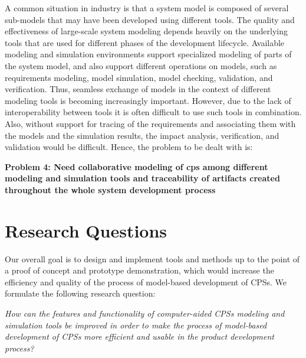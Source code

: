 A common situation in industry is that a system model is composed of several sub-models that may have been developed using different tools. The quality and effectiveness of large-scale system modeling depends heavily on the underlying tools that are used for different phases of the development lifecycle. Available modeling and simulation environments support specialized modeling of parts of the system model, and also support different operations on models, such as requirements modeling, model simulation, model checking, validation, and verification. Thus, seamless exchange of models in the context of different modeling tools is becoming increasingly important. However, due to the lack of interoperability between tools it is often difficult to use such tools in combination. Also, without support for tracing of the requirements and associating them with the models and the simulation results, the impact analysis, verification, and validation would be difficult. Hence, the problem to be dealt with is:

\begin{description}

\item \textbf{Problem 4: Need collaborative modeling of \acrshort{cps} among different modeling and simulation tools and traceability of artifacts created throughout the whole system development process}

\end{description}


\section{Research Questions}
\label{sec:Research Questions}

Our overall goal is to design and implement tools and methods up to the point of a proof of concept and prototype demonstration, which would increase the efficiency and quality of the process of model-based development of CPSs. We formulate the following research question:

\textit{How can the features and functionality of computer-aided CPSs modeling and simulation tools be improved in order to make the process of model-based development of CPSs more efficient and usable in the product development process?} 

